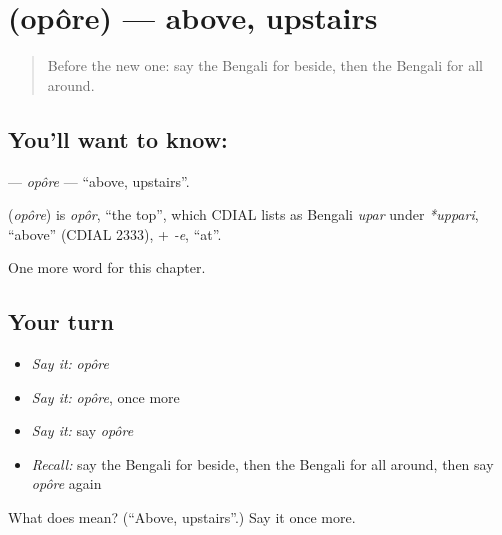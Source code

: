 \section[\texorpdfstring{\bn{ওপরে} (opôre)}{ওপরে (opôre)}]{ (opôre) — above, upstairs}

\label{lesson:BN-C216-opore}



\begin{quote}
Before the new one: say the Bengali for beside, then the Bengali for all around.
\end{quote}

\subsection*{You'll want to know: }
\textbf{} — \emph{opôre} — \textquotedblleft{}above, upstairs\textquotedblright{}.

\begin{cousinweb}
\textbf{} (\emph{opôre}) is \emph{opôr}, \textquotedblleft{}the top\textquotedblright{}, which CDIAL lists as Bengali \emph{upar} under \emph{*uppari}, \textquotedblleft{}above\textquotedblright{} (CDIAL 2333), + \emph{-e}, \textquotedblleft{}at\textquotedblright{}.
\end{cousinweb}

\begin{grammarlens}[title={What you've built}]
One more word for this chapter.
\end{grammarlens}

\subsection*{Your turn}
\begin{itemize}
\raggedright
  \item \emph{Say it:} \emph{opôre}
  \item \emph{Say it:} \emph{opôre}, once more
  \item \emph{Say it:} say \emph{opôre}
  \item \emph{Recall:} say the Bengali for beside, then the Bengali for all around, then say \emph{opôre} again
\end{itemize}

\begin{tcolorbox}[breakable,colback=teal!4,colframe=teal!35!black,title={Before you move on}]
What does  mean? (\textquotedblleft{}Above, upstairs\textquotedblright{}.) Say it once more.
\end{tcolorbox}
